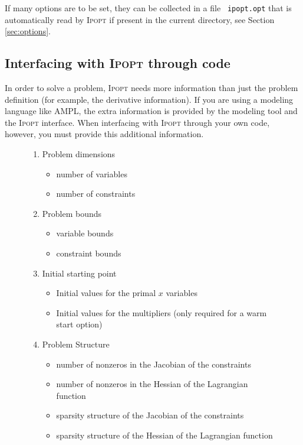 \documentclass[10pt]{article}
\newcommand{\Ipopt}{\textsc{Ipopt}\xspace}
\begin{document}
If many options are to be set, they can be collected in a file {\tt
  ipopt.opt} that is automatically read by \Ipopt if present in
the current directory, see Section \ref{sec:options}.


\subsection{Interfacing with \Ipopt through code}
In order to solve a problem, \Ipopt needs more information than just
the problem definition (for example, the derivative information). If
you are using a modeling language like AMPL, the extra information is
provided by the modeling tool and the \Ipopt interface. When
interfacing with \Ipopt through your own code, however, you must
provide this additional information.

\begin{figure}
\begin{enumerate}
\item Problem dimensions \label{it.prob_dim}
  \begin{itemize}
  \item number of variables
  \item number of constraints
  \end{itemize}
\item Problem bounds
  \begin{itemize}
  \item variable bounds
  \item constraint bounds
  \end{itemize}
\item Initial starting point
  \begin{itemize}
  \item Initial values for the primal $x$ variables
  \item Initial values for the multipliers (only
    required for a warm start option)
  \end{itemize}
\item Problem Structure \label{it.prob_struct}
  \begin{itemize}
  \item number of nonzeros in the Jacobian of the constraints
  \item number of nonzeros in the Hessian of the Lagrangian function
  \item sparsity structure of the Jacobian of the constraints
  \item sparsity structure of the Hessian of the Lagrangian function
  \end{itemize}

\end{enumerate}
\end{figure}
\end{document}
